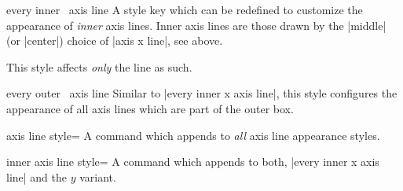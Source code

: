 \begin{pgfplotsxykey}{every inner \x\ axis line}
    A style key which can be redefined to customize the appearance of
    \emph{inner} axis lines. Inner axis lines are those drawn by the |middle|
    (or |center|) choice of |axis x line|, see above.

    This style affects \emph{only} the line as such.
\begin{codeexample}[]
\end{codeexample}
\end{pgfplotsxykey}

\begin{pgfplotsxykey}{every outer \x\ axis line}
    Similar to |every inner x axis line|, this style configures the appearance
    of all axis lines which are part of the outer box.
\begin{codeexample}[]
\end{codeexample}
\end{pgfplotsxykey}

\begin{pgfplotskey}{axis line style=}
    A command which appends  to \emph{all} axis line
    appearance styles.
\end{pgfplotskey}

\begin{pgfplotskey}{inner axis line style=}
    A command which appends  to both,
    |every inner x axis line| and the $y$ variant.
\end{pgfplotskey}

